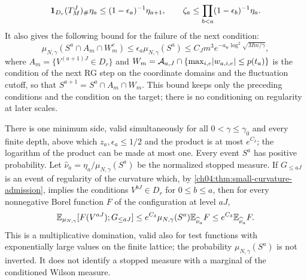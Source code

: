 \begin{lemma}
\[
 \mathbf 1_{D_r}(T_M^J)_\#\eta_a\le(1-\epsilon_a)^{-1}\eta_{a+1},\qquad
 \zeta_a\le\prod_{b<a}(1-\epsilon_b)^{-1}\eta_a.
\]
It also gives the following bound for the failure of the next condition:
\[
 \mu_{N,\gamma}(S^a\cap A_m\cap W_m^c)\le\epsilon_a\mu_{N,\gamma}(S^a)\le C_Jm^3e^{-a_{\mathrm w}\log^2\sqrt{Mm/\gamma}},
\]
where $A_m=\{V^{(a+1)J}\in D_r\}$ and $W_m=\mathcal A_{a,J}\cap\{\max_{i,e}\lvert w_{a,i,e}\rvert\le p(t_a)\}$ is the condition of the next RG step on the coordinate domains and the fluctuation cutoff, so that $S^{a+1}=S^a\cap A_m\cap W_m$. This bound keeps only the preceding conditions and the condition on the target; there is no conditioning on regularity at later scales.

There is one minimum side, valid simultaneously for all $0<\gamma\le\gamma_0$ and every finite depth, above which $z_a,\epsilon_a\le1/2$ and the product is at most $e^{C_\delta}$; the logarithm of the product can be made at most one. Every event $S^a$ has positive probability. Let $\widehat\nu_a=\eta_a/\mu_{N,\gamma}(S^a)$ be the normalized stopped measure. If $G_{\le aJ}$ is an event of regularity of the curvature which, by \cref{ch04:thm:small-curvature-admission}, implies the conditions $V^{bJ}\in D_r$ for $0\le b\le a$, then for every nonnegative Borel function $F$ of the configuration at level $aJ$,
\[
 \mathbb E_{\mu_{N,\gamma}}[F(V^{aJ});G_{\le aJ}]\le e^{C_\delta}\mu_{N,\gamma}(S^a)\mathbb E_{\widehat\nu_a}F\le e^{C_\delta}\mathbb E_{\widehat\nu_a}F.
\]
This is a multiplicative domination, valid also for test functions with exponentially large values on the finite lattice; the probability $\mu_{N,\gamma}(S^a)$ is not inverted. It does not identify a stopped measure with a marginal of the conditioned Wilson measure.


\end{lemma}
